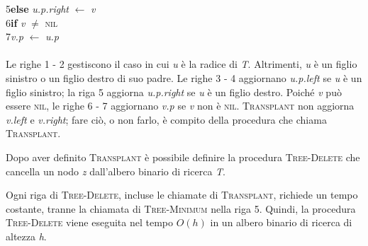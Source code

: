 \documentclass[10pt, a4paper]{report}
\newcommand\firsttab[1][0.5cm]{\hspace*{#1}}
\newcommand\secondtab[1][1cm]{\hspace*{#1}}
\begin{document}
5\firsttab\textbf{else} \textit{u.p.right} $\leftarrow$ \textit{v}\\
6\firsttab\textbf{if} \textit{v} $\not=$ \textsc{nil}\\
7\secondtab\textit{v.p} $\leftarrow$ \textit{u.p}\\\\
Le righe 1 - 2 gestiscono il caso in cui \textit{u} è la radice di \textit{T}. Altrimenti, \textit{u} è un figlio sinistro o un figlio destro di suo padre. Le righe 3 - 4 aggiornano \textit{u.p.left} se \textit{u} è un figlio sinistro; la riga 5 aggiorna \textit{u.p.right} se \textit{u} è un figlio destro. Poiché \textit{v} può essere \textsc{nil}, le righe 6 - 7 aggiornano \textit{v.p} se \textit{v} non è \textsc{nil}. \textsc{Transplant} non aggiorna \textit{v.left} e \textit{v.right}; fare ciò, o non farlo, è compito della procedura che chiama \textsc{Transplant}.

Dopo aver definito \textsc{Transplant} è possibile definire la procedura \textsc{Tree-Delete} che cancella un nodo \textit{z} dall'albero binario di ricerca \textit{T}.

Ogni riga di \textsc{Tree-Delete}, incluse le chiamate di \textsc{Transplant}, richiede un tempo costante, tranne la chiamata di \textsc{Tree-Minimum} nella riga 5. Quindi, la procedura \textsc{Tree-Delete} viene eseguita nel tempo $O(h)$ in un albero binario di ricerca di altezza \textit{h}.
\end{document}
